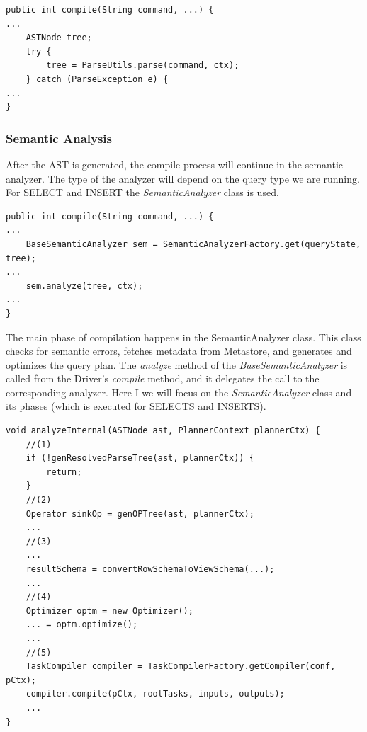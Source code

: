 \begin{lstlisting}
public int compile(String command, ...) {
...
	ASTNode tree;
	try {
		tree = ParseUtils.parse(command, ctx);
	} catch (ParseException e) {
...
}
\end{lstlisting}
\subsubsection{Semantic Analysis}
After the AST is generated, the compile process will continue in the semantic analyzer. The type of the analyzer will depend on the query type we are running. For SELECT and INSERT the \textit{SemanticAnalyzer} class is used. 

\begin{lstlisting}
public int compile(String command, ...) {
...
	BaseSemanticAnalyzer sem = SemanticAnalyzerFactory.get(queryState, tree);
...
	sem.analyze(tree, ctx);
...
}
\end{lstlisting}

The main phase of compilation happens in the SemanticAnalyzer class. This class checks for semantic errors, fetches metadata from Metastore, and generates and optimizes the query plan. The \textit{analyze} method of the \textit{BaseSemanticAnalyzer} is called from the Driver's \textit{compile} method, and it delegates the call to the corresponding analyzer. Here I we will focus on the \textit{SemanticAnalyzer} class and its phases (which is executed for SELECTS and INSERTS).

\begin{lstlisting}
void analyzeInternal(ASTNode ast, PlannerContext plannerCtx) {
	//(1)
	if (!genResolvedParseTree(ast, plannerCtx)) {
		return;
	}
	//(2)
	Operator sinkOp = genOPTree(ast, plannerCtx);
	...
	//(3)
	...
	resultSchema = convertRowSchemaToViewSchema(...);
	...
	//(4)
	Optimizer optm = new Optimizer();
	... = optm.optimize();
	...
	//(5)
	TaskCompiler compiler = TaskCompilerFactory.getCompiler(conf, pCtx);
	compiler.compile(pCtx, rootTasks, inputs, outputs);
	...
}
\end{lstlisting}


